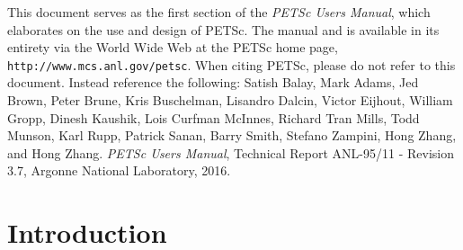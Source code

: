 \vspace{1.0cm}



 This document serves as the first section of the {\em PETSc Users
Manual}, which elaborates on the use and design of PETSc. The
manual and is available in its entirety via the World Wide Web at
the PETSc home page, {\tt http://www.mcs.anl.gov/petsc}.
When citing PETSc, please do
not refer to this document. Instead reference the following: Satish
Balay, Mark Adams, Jed Brown, Peter Brune, Kris Buschelman, Lisandro Dalcin, Victor Eijhout, William Gropp, Dinesh Kaushik,
Lois Curfman McInnes, Richard Tran Mills, Todd Munson, Karl Rupp, Patrick Sanan, Barry Smith, Stefano Zampini, Hong Zhang, and Hong Zhang.  {\em
PETSc Users Manual}, Technical Report ANL-95/11 - Revision 3.7,
Argonne National Laboratory, 2016.

%
\newpage


\newpage
\section{Introduction}



